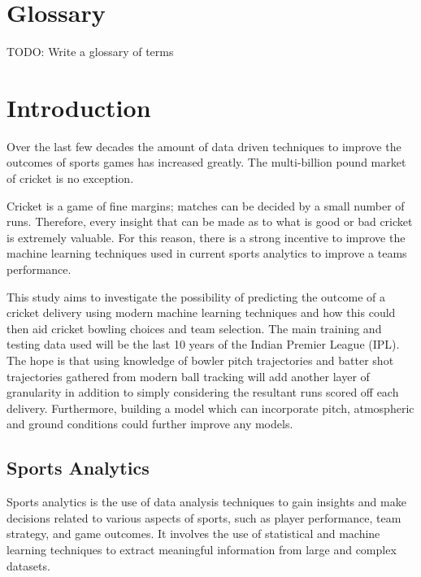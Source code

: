\documentclass[12pt,a4paper]{report}
\theoremstyle{definition}
\begin{document}
\chapter*{Glossary}
TODO: Write a glossary of terms

\newpage
\setcounter{page}{1}

\chapter{Introduction}

Over the last few decades the amount of data driven techniques to improve the outcomes of sports games has increased greatly. 
The multi-billion pound market of cricket is no exception. 

Cricket is a game of fine margins; matches can be decided by a small number of runs.
Therefore, every insight that can be made as to what is good or bad cricket is extremely valuable.
For this reason, there is a strong incentive to improve the machine learning techniques used in current sports analytics to improve a teams performance.

This study aims to investigate the possibility of predicting the outcome of a cricket delivery using modern machine learning techniques and how this could then aid cricket bowling choices and team selection. 
The main training and testing data used will be the last 10 years of the Indian Premier League (IPL).
The hope is that using knowledge of bowler pitch trajectories and batter shot trajectories gathered from modern ball tracking will add another layer of granularity in addition to simply considering the resultant runs scored off each delivery. 
Furthermore, building a model which can incorporate pitch, atmospheric and ground conditions could further improve any models. 

\section{Sports Analytics}

Sports analytics is the use of data analysis techniques to gain insights and make decisions related to various aspects of sports, such as player performance, team strategy, and game outcomes. 
It involves the use of statistical and machine learning techniques to extract meaningful information from large and complex datasets.
\end{document}
